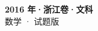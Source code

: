\documentclass[zihao=-4, a4paper]{ctexart}
\begin{document}
\begin{center}
  {\Large\bfseries 2016 年·浙江卷·文科}\\[4pt]
  {\large 数学 · 试题版}
\end{center}
\medskip
{}

\end{document}
